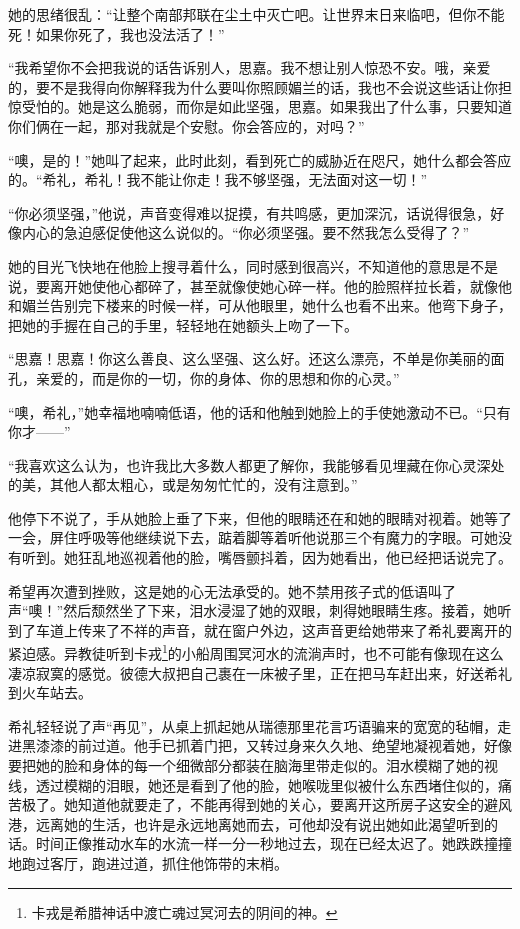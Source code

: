 \par 她的思绪很乱：“让整个南部邦联在尘土中灭亡吧。让世界末日来临吧，但你不能死！如果你死了，我也没法活了！”
\par “我希望你不会把我说的话告诉别人，思嘉。我不想让别人惊恐不安。哦，亲爱的，要不是我得向你解释我为什么要叫你照顾媚兰的话，我也不会说这些话让你担惊受怕的。她是这么脆弱，而你是如此坚强，思嘉。如果我出了什么事，只要知道你们俩在一起，那对我就是个安慰。你会答应的，对吗？”
\par “噢，是的！”她叫了起来，此时此刻，看到死亡的威胁近在咫尺，她什么都会答应的。“希礼，希礼！我不能让你走！我不够坚强，无法面对这一切！”
\par “你必须坚强，”他说，声音变得难以捉摸，有共鸣感，更加深沉，话说得很急，好像内心的急迫感促使他这么说似的。“你必须坚强。要不然我怎么受得了？”
\par 她的目光飞快地在他脸上搜寻着什么，同时感到很高兴，不知道他的意思是不是说，要离开她使他心都碎了，甚至就像使她心碎一样。他的脸照样拉长着，就像他和媚兰告别完下楼来的时候一样，可从他眼里，她什么也看不出来。他弯下身子，把她的手握在自己的手里，轻轻地在她额头上吻了一下。
\par “思嘉！思嘉！你这么善良、这么坚强、这么好。还这么漂亮，不单是你美丽的面孔，亲爱的，而是你的一切，你的身体、你的思想和你的心灵。”
\par “噢，希礼，”她幸福地喃喃低语，他的话和他触到她脸上的手使她激动不已。“只有你才——”
\par “我喜欢这么认为，也许我比大多数人都更了解你，我能够看见埋藏在你心灵深处的美，其他人都太粗心，或是匆匆忙忙的，没有注意到。”
\par 他停下不说了，手从她脸上垂了下来，但他的眼睛还在和她的眼睛对视着。她等了一会，屏住呼吸等他继续说下去，踮着脚等着听他说那三个有魔力的字眼。可她没有听到。她狂乱地巡视着他的脸，嘴唇颤抖着，因为她看出，他已经把话说完了。
\par 希望再次遭到挫败，这是她的心无法承受的。她不禁用孩子式的低语叫了声“噢！”然后颓然坐了下来，泪水浸湿了她的双眼，刺得她眼睛生疼。接着，她听到了车道上传来了不祥的声音，就在窗户外边，这声音更给她带来了希礼要离开的紧迫感。异教徒听到卡戎\footnote{卡戎是希腊神话中渡亡魂过冥河去的阴间的神。}的小船周围冥河水的流淌声时，也不可能有像现在这么凄凉寂寞的感觉。彼德大叔把自己裹在一床被子里，正在把马车赶出来，好送希礼到火车站去。
\par 希礼轻轻说了声“再见”，从桌上抓起她从瑞德那里花言巧语骗来的宽宽的毡帽，走进黑漆漆的前过道。他手已抓着门把，又转过身来久久地、绝望地凝视着她，好像要把她的脸和身体的每一个细微部分都装在脑海里带走似的。泪水模糊了她的视线，透过模糊的泪眼，她还是看到了他的脸，她喉咙里似被什么东西堵住似的，痛苦极了。她知道他就要走了，不能再得到她的关心，要离开这所房子这安全的避风港，远离她的生活，也许是永远地离她而去，可他却没有说出她如此渴望听到的话。时间正像推动水车的水流一样一分一秒地过去，现在已经太迟了。她跌跌撞撞地跑过客厅，跑进过道，抓住他饰带的末梢。
